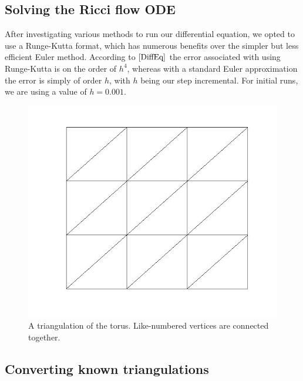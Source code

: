 \documentclass[12pt]{article}
\begin{document}
\subsection{Solving the Ricci flow ODE}
\maketitle
After investigating various methods to run our differential equation, we opted to use a Runge-Kutta format, which has numerous benefits over the simpler but less efficient Euler method. According to $\cite{DiffEq}$ the error associated with using Runge-Kutta is on the order of $h^4$, whereas with a standard Euler approximation the error is simply of order $h$, with $h$ being our step incremental. For initial runs, we are using a value of $h = 0.001$.\newline
  
  \begin{figure}
  \includegraphics[scale = 0.4]{torus2.jpg}
  \caption{A triangulation of the torus. Like-numbered vertices are connected together.}
  \end{figure}

\subsection{Converting known triangulations}
\maketitle
\end{document}
